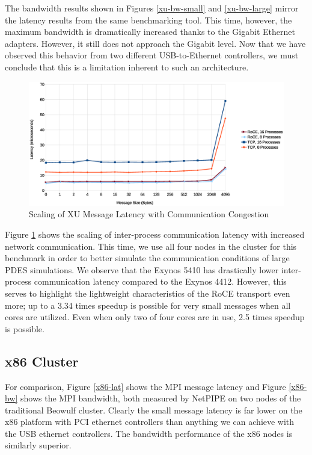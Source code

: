\documentclass[11pt]{book}
\begin{document}
The bandwidth results shown in Figures \ref{xu-bw-small} and \ref{xu-bw-large} mirror the
latency results from the same benchmarking tool.  This time, however, the maximum
bandwidth is dramatically increased thanks to the Gigabit Ethernet adapters.  However, it
still does not approach the Gigabit level.  Now that we have observed this behavior from
two different USB-to-Ethernet controllers, we must conclude that this is a limitation
inherent to such an architecture.

\begin{figure}
\includegraphics[width=\textwidth]{xu_imb}
\caption{Scaling of XU Message Latency with Communication Congestion}
\label{xu-imb-low}
\end{figure}

Figure \ref{xu-imb-low} shows the scaling of inter-process communication latency with
increased network communication.  This time, we use all four nodes in the cluster for this
benchmark in order to better simulate the communication conditions of large PDES
simulations.  We observe that the Exynos 5410 has drastically lower inter-process
communication latency compared to the Exynos 4412.  However, this serves to highlight the
lightweight characteristics of the RoCE transport even more; up to a 3.34 times speedup is
possible for very small messages when all cores are utilized.  Even when only two of four
cores are in use, 2.5 times speedup is possible.

\subsection{x86 Cluster}

For comparison, Figure \ref{x86-lat} shows the MPI message latency and Figure \ref{x86-bw}
shows the MPI bandwidth, both measured by NetPIPE on two nodes of the traditional Beowulf
cluster.  Clearly the small message latency is far lower on the x86 platform with PCI
ethernet controllers than anything we can achieve with the USB ethernet controllers.  The
bandwidth performance of the x86 nodes is similarly superior.
\end{document}
